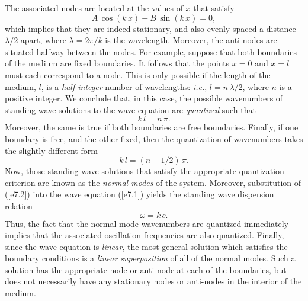 The associated nodes are located at the values of $x$ that satisfy
\begin{equation}
A\,\cos(k\,x)+ B\,\sin(k\,x) = 0,
\end{equation}
which implies that they are indeed  stationary, and also evenly spaced a distance $\lambda/2$
apart, where $\lambda=2\pi/k$ is the wavelength. Moreover, the anti-nodes
are situated halfway between the nodes. For example, suppose that both boundaries
of the medium
are fixed boundaries. It follows that the points $x=0$ and $x=l$ must each correspond to a node. This is
only possible if the length of the medium, $l$,  is a {\em half-integer}\/ number of wavelengths: {\em i.e.},
 $l = n\,\lambda/2$, where $n$ is a positive integer. We conclude that, in this case, the possible
wavenumbers of standing wave solutions to the wave equation are {\em quantized}\/ such that
\begin{equation}
k\,l = n\,\pi.
\end{equation}
Moreover, the same is true if both boundaries are free boundaries. Finally, if one boundary is free, and the
other fixed, then the quantization of wavenumbers takes the slightly different form
\begin{equation}
k\,l = (n-1/2)\,\pi.
\end{equation}
Now, those standing wave solutions that satisfy the appropriate quantization criterion are known as the
{\em normal modes}\/ of the system. Moreover, substitution of (\ref{e7.2})
into the wave equation (\ref{e7.1}) yields the standing wave dispersion relation
\begin{equation}\label{e7.6}
\omega= k\,c.
\end{equation}
Thus, the fact that the   normal mode wavenumbers are  quantized immediately implies that the associated
oscillation frequencies  are also quantized. Finally, since the
wave equation is {\em linear}, the most general solution which satisfies the
boundary conditions is a {\em linear superposition}\/ of all of the normal modes. Such a
solution has the appropriate node or anti-node at each of the boundaries, but
does not necessarily have any stationary nodes or anti-nodes in the interior of the medium. 


